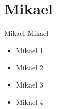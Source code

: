 \section{Mikael}
\begin{frame}{Mikael}{}
  Mikael
  \begin{itemize}
    \item<1-> Mikael 1
    \item<2-> Mikael 2
    \item<3-> Mikael 3
    \item<4-> Mikael 4
  \end{itemize}
\end{frame}
